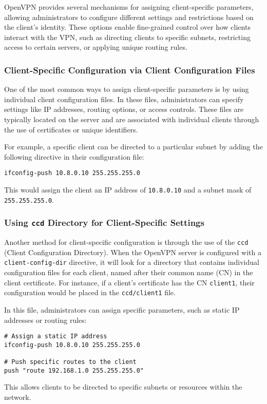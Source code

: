OpenVPN provides several mechanisms for assigning client-specific parameters, allowing administrators to configure different settings and restrictions based on the client’s identity. These options enable fine-grained control over how clients interact with the VPN, such as directing clients to specific subnets, restricting access to certain servers, or applying unique routing rules. 

\subsubsection{Client-Specific Configuration via Client Configuration Files}

One of the most common ways to assign client-specific parameters is by using individual client configuration files. In these files, administrators can specify settings like IP addresses, routing options, or access controls. These files are typically located on the server and are associated with individual clients through the use of certificates or unique identifiers.

For example, a specific client can be directed to a particular subnet by adding the following directive in their configuration file:
\begin{verbatim}
ifconfig-push 10.8.0.10 255.255.255.0
\end{verbatim}
This would assign the client an IP address of \texttt{10.8.0.10} and a subnet mask of \texttt{255.255.255.0}.

\subsubsection{Using \texttt{ccd} Directory for Client-Specific Settings}

Another method for client-specific configuration is through the use of the \texttt{ccd} (Client Configuration Directory). When the OpenVPN server is configured with a \texttt{client-config-dir} directive, it will look for a directory that contains individual configuration files for each client, named after their common name (CN) in the client certificate. For instance, if a client’s certificate has the CN \texttt{client1}, their configuration would be placed in the \texttt{ccd/client1} file.

In this file, administrators can assign specific parameters, such as static IP addresses or routing rules:
\begin{verbatim}
# Assign a static IP address
ifconfig-push 10.8.0.10 255.255.255.0

# Push specific routes to the client
push "route 192.168.1.0 255.255.255.0"
\end{verbatim}
This allows clients to be directed to specific subnets or resources within the network.

